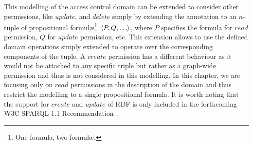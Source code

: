 This modelling of the access control domain can be extended to consider other permissions, like $\mathit{update}$, and
$\mathit{delete}$ simply by extending the annotation to an $n$-tuple of propositional formul\ae\footnote{One formula,
  two formul\ae.}~$\tuple{P,Q,\dots}$, where $P$ specifies the formula for $\mathit{read}$ permission, $Q$ for
$\mathit{update}$ permission, etc.  This extension allows to use the defined domain operations simply extended to
operate over the corresponding components of the tuple.
%
A $\mathit{create}$ permission has a different behaviour as it would not be attached to any specific triple but rather
as a graph-wide permission and thus is not considered in this modelling.
%
In this chapter, we are focusing only on $\mathit{read}$ permissions in the description of the domain and thus restrict
the modelling to a single propositional formula.
%
It is worth noting that the support for $\mathit{create}$ and $\mathit{update}$ of \ac{RDF} is only included in the
forthcoming W3C SPARQL 1.1 Recommendation~\cite{HarrisSeaborne:2012aa}.


